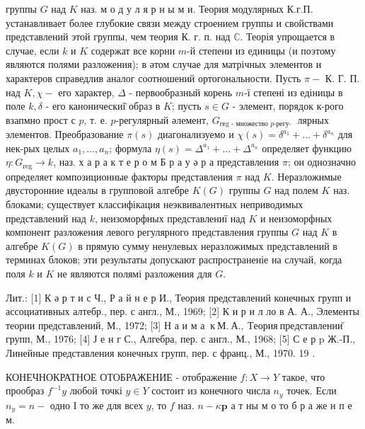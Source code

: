 \documentclass[10pt]{article}
\begin{document}
группы $G$ над $K$ наз. м о д у л я р н ы м и. Теория модулярных К.г.П. устанавливает более глубокие связи между строением группы и свойствами представлений этой группы, чем теория К. г. п. над $\mathbb{C}$. Теорія упрощается в случае, если $k$ и $K$ содержат все корни $m$-й степени из единицы (и поэтому являются полями разложения); в әтом случае для матрічных элементов и характеров справедлив аналог соотношений ортогональности. Пусть $\pi-$ К. Г. П. над $K, \chi-$ его характер, $\Delta$ - первообразный корень $m$-ї степені из едіницы в поле $k, \delta$ - его каноническиї̈ образ в $K$; пусть $s \in G$ - элемент, порядок к-рого взапмно прост с $p$, т. е. $p$-регулярный әлемент, $G_{\text {геg - множество } p \text {-регу- }}$ лярных элементов. Преобразование $\pi(s)$ диагонализуемо и $\chi(s)=\delta^{a_{1}}+\ldots+\delta^{a_{n}}$ для нек-рых целых $a_{1}, \ldots, a_{n}$; формула $\eta(s)=\Delta^{a_{1}}+\ldots+\Delta^{a_{n}}$ определяет функцию $\eta: G_{\mathrm{reg}} \rightarrow k$, наз. х а р а к т е р о м Б р а у ә р а представления $\pi$; он однозначно определяет композиционные факторы представления $\pi$ над $K$. Неразложнмые двусторонние идеалы в групповой алгебре $K(G)$ группы $G$ над полем $K$ наз. блоками; существует классифікация неэквивалентных неприводимых представлений над $k$, неизоморфных представлениї над $K$ и неизоморфных компонент разложения левого регулярного представления группы $G$ над $K$ в алгебре $K(G)$ в прямую сумму ненулевых неразложимых представлений в терминах блоков; эти результаты допускают распространеніе на случай, когда поля $k$ и $K$ не являются полямі разложения для $G$.



Лит.: [1] К ә р т и с Ч., Р а й н е р И., Теория представлений конечных групп и ассоциативных алтебр., пер. с англ., М., 1969; [2] К и р и л ло в А. А., Элементы теории представлений, М., 1972; [3] Н а и м а $\mathbf{~ к ~ М . ~ А . , ~ Т е о р и я ~ п р е д с т а в л е н и и ̆ ~}$ групп, М., 1976; [4] Ј е н г С., Алгебра, пер. с англ., М., 1968; [5] С е р p Ж.-П., Линейные представления конечных групп, пер. с франц., М., 1970. 19 .



КОНЕЧНОКРАТНОЕ ОТОБРАЖЕНИЕ - отображение $f: X \rightarrow Y$ такое, что прообраз $f^{-1} y$ любой точкі $y \in Y$ состоит из конечного числа $n_{y}$ точек. Если $n_{y}=n-$ одно І то же для всех $y$, то $f$ наз. $n-\kappa \mathbf{p}$ а т ны м о то б р а же н п е м.
\end{document}
